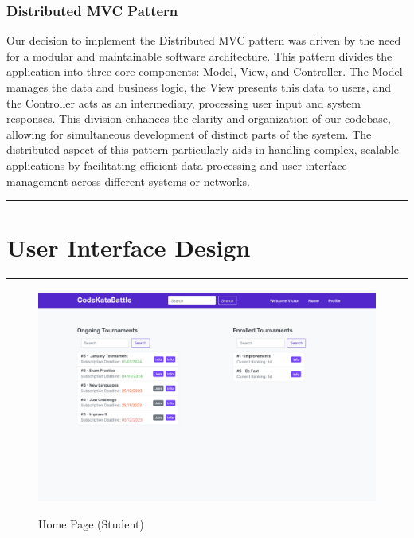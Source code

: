 \documentclass{Configuration_Files/Template}
\begin{document}
\subsection{Distributed MVC Pattern}

Our decision to implement the Distributed MVC pattern was driven by the need for a modular and maintainable software architecture. This pattern divides the application into three core components: Model, View, and Controller. The Model manages the data and business logic, the View presents this data to users, and the Controller acts as an intermediary, processing user input and system responses. This division enhances the clarity and organization of our codebase, allowing for simultaneous development of distinct parts of the system. The distributed aspect of this pattern particularly aids in handling complex, scalable applications by facilitating efficient data processing and user interface management across different systems or networks.

{\color{bluepoli}\rule{\linewidth}{0.1pt}}

\chapter{User Interface Design}

{\color{bluepoli}\rule{\linewidth}{0.1pt}}

\begin{figure}[H]
\centering
\includegraphics[scale = 0.25]{Images/UI/MainPage_Student.png}\\
\caption{Home Page (Student)}
\end{figure}
\end{document}

